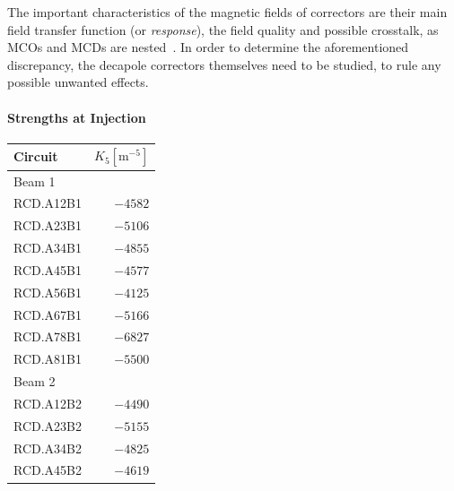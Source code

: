 The important characteristics of the magnetic fields of correctors are their main field transfer
function (or \textit{response}), the field quality and possible crosstalk, as MCOs and MCDs are
nested~\cite{venturini_delsolaro_magnetic_2005}.
In order to determine the aforementioned discrepancy, the decapole correctors themselves need to be
studied, to rule any possible unwanted effects.


\paragraph{Strengths at Injection}

\begin{table}
    \centering
    \begin{tabular}{lr}
        \toprule
        Circuit   & $K_5 [\textrm{m}^{-5}]$ \\
        \midrule
        Beam 1    & \\
        \hspace{2mm}RCD.A12B1 & $-4582$ \\
        \hspace{2mm}RCD.A23B1 & $-5106$ \\
        \hspace{2mm}RCD.A34B1 & $-4855$ \\
        \hspace{2mm}RCD.A45B1 & $-4577$ \\
        \hspace{2mm}RCD.A56B1 & $-4125$ \\
        \hspace{2mm}RCD.A67B1 & $-5166$ \\
        \hspace{2mm}RCD.A78B1 & $-6827$ \\
        \hspace{2mm}RCD.A81B1 & $-5500$ \\
        Beam 2    & \\
        \hspace{2mm}RCD.A12B2 & $-4490$ \\
        \hspace{2mm}RCD.A23B2 & $-5155$ \\
        \hspace{2mm}RCD.A34B2 & $-4825$ \\
        \hspace{2mm}RCD.A45B2 & $-4619$ \\

\end{tabular}
\end{table}
